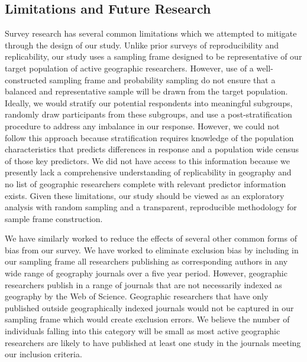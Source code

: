 \documentclass[]{interact}
\theoremstyle{plain}%
\theoremstyle{definition}
\theoremstyle{remark}
\begin{document}
\subsection*{Limitations and Future Research} 
Survey research has several common limitations which we attempted to mitigate through the design of our study. 
Unlike prior surveys of reproducibility and replicability, our study uses a sampling frame designed to be representative of our target population of active geographic researchers. 
However, use of a well-constructed sampling frame and probability sampling do not ensure that a balanced and representative sample will be drawn from the target population. 
Ideally, we would stratify our potential respondents into meaningful subgroups, randomly draw participants from these subgroups, and use a post-stratification procedure to address any imbalance in our response. 
However, we could not follow this approach because stratification requires knowledge of the population characteristics that predicts differences in response and a population wide census of those key predictors.
We did not have access to this information because we presently lack a comprehensive understanding of replicability in geography and no list of geographic researchers complete with relevant predictor information exists.
Given these limitations, our study should be viewed as an exploratory analysis with random sampling and a transparent, reproducible methodology for sample frame construction.

We have similarly worked to reduce the effects of several other common forms of bias from our survey.
We have worked to eliminate exclusion bias by including in our sampling frame all researchers publishing as corresponding authors in any wide range of geography journals over a five year period.
However, geographic researchers publish in a range of journals that are not necessarily indexed as geography by the Web of Science. 
Geographic researchers that have only published outside geographically indexed journals would not be captured in our sampling frame which would create exclusion errors. 
We believe the number of individuals falling into this category will be small as most active geographic researchers are likely to have published at least one study in the journals meeting our inclusion criteria.
\end{document}
